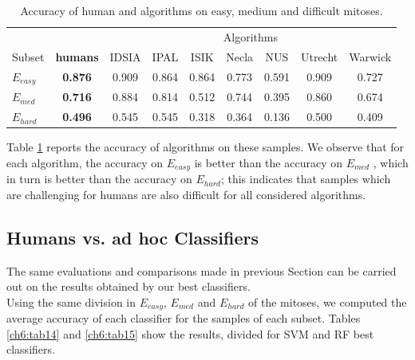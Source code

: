 \begin{table}[!hbt]
\small
 \centering
 \begin{tabular}{lcccccccc}
  \toprule
           &            &   \multicolumn{7}{c}{Algorithms}  \\
    \cmidrule(lr){3-9}
    Subset & \textbf{humans}     & IDSIA & IPAL & ISIK   & Necla & NUS & Utrecht & Warwick \\
    \midrule
     $E_{easy}$   & \textbf{0.876} & 0.909 & 0.864 & 0.864 & 0.773 & 0.591 & 0.909 & 0.727  \\
     $E_{med}$    & \textbf{0.716} & 0.884 & 0.814 & 0.512 & 0.744 & 0.395 & 0.860 & 0.674  \\ 
     $E_{hard}$   & \textbf{0.496} & 0.545 & 0.545 & 0.318 & 0.364 & 0.136 & 0.500 & 0.409  \\
     \bottomrule
 \end{tabular}
 \caption{Accuracy of human and algorithms on easy, medium and difficult mitoses.}
 \label{ch6:tab13}
\end{table}


Table \ref{ch6:tab13} reports the accuracy of algorithms on these samples. We observe that for each algorithm, the accuracy on $E_{easy}$ is
better than the accuracy on $E_{med}$ , which in turn is better than the accuracy
on $E_{hard}$; this indicates that samples which are challenging for humans are also
difficult for all considered algorithms.


\vspace{0.5cm}

\subsection{Humans vs. ad hoc Classifiers}
\label{ch6:sec_class}

The same evaluations and comparisons made in previous Section can be carried out on the results obtained by our best classifiers.\\
Using the same division in $E_{easy}$, $E_{med}$ and $E_{hard}$ of the mitoses, we computed the average accuracy of each classifier for the samples of each subset.
Tables \ref{ch6:tab14} and \ref{ch6:tab15} show the results, divided for \Gls{SVM} and \Gls{RF} best classifiers.



